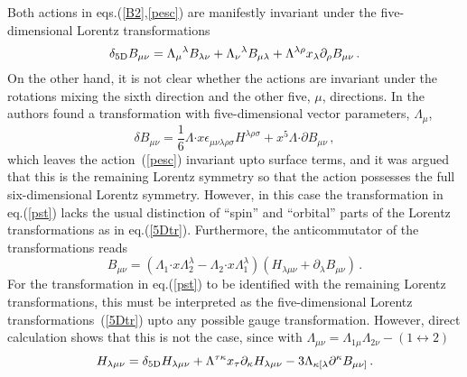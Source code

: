 \documentclass[a4paper,12pt]{article}
\begin{document}
Both actions in eqs.(\ref{B2},\ref{pesc}) are 
manifestly invariant under  the five-dimensional Lorentz transformations
\begin{equation}
\delta_{5{\rm D}}B_{\mu\nu}=\Lambda_{\mu}{}^{\lambda}B_{\lambda\nu}+\Lambda_{\nu}{}^{\lambda}B_{\mu\lambda}+\Lambda^{\lambda\rho}x_{\lambda}\partial_{\rho}B_{\mu\nu}\,.
\label{5Dtr}
\end{equation}  
On the other hand, it is not clear whether the actions are invariant under the rotations mixing  the sixth direction and  the other five, $\mu$, directions.   In \cite{9611065} the authors found a transformation with five-dimensional vector parameters, 
$\Lambda_{\mu}$, 
\begin{equation}
\delta B_{\mu\nu}=\textstyle{\frac{1}{6}}\Lambda{\cdot x}\epsilon_{\mu\nu\lambda\rho\sigma}H^{\lambda\rho\sigma}+ x^{5}\Lambda{\cdot\partial}B_{\mu\nu}\,,
\label{pst}
\end{equation}
which leaves the action~(\ref{pesc}) invariant upto surface terms, and it was argued that this is the remaining Lorentz symmetry so that the action possesses the full six-dimensional Lorentz symmetry.  However, in this case the transformation in eq.(\ref{pst}) lacks the usual distinction of ``spin''  and ``orbital'' parts of the Lorentz transformations as in eq.(\ref{5Dtr}).     
Furthermore, the anticommutator of the transformations reads
\begin{equation}
[\delta_{2},\delta_{1}]B_{\mu\nu}=(\Lambda_{1}{\cdot x}\Lambda_{2}^{\lambda}-\Lambda_{2}{\cdot x}\Lambda_{1}^{\lambda})(H_{\lambda\mu\nu}+\partial_{\lambda}B_{\mu\nu})\,.
\label{com21}
\end{equation}
For the transformation in eq.(\ref{pst}) to be identified with the remaining Lorentz transformations, this must be interpreted as   
the five-dimensional  Lorentz transformations~(\ref{5Dtr})  upto any possible gauge transformation.  However, direct calculation shows that this is not the case, since 
with $\Lambda_{\mu\nu}=\Lambda_{1\mu}\Lambda_{2\nu}-(1\leftrightarrow 2)$
\begin{equation}
[\delta_{2},\delta_{1}]H_{\lambda\mu\nu}=\delta_{5{\rm D}}H_{\lambda\mu\nu}+\Lambda^{\tau\kappa}x_{\tau}\partial_{\kappa}H_{\lambda\mu\nu}-3\Lambda_{\kappa [\lambda}\partial^{\kappa}B_{\mu\nu]}\,.
\end{equation}
\end{document}
